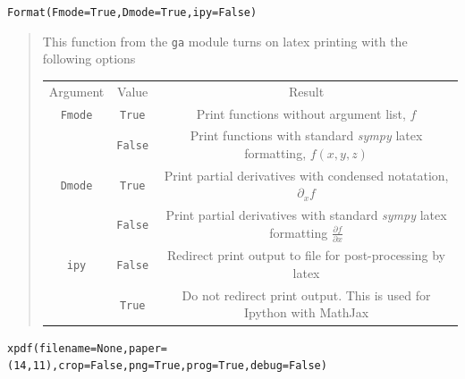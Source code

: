\documentclass[12pt,twoside,openright]{memoir}
\newcommand{\lp}{\left (}
\newcommand{\rp}{\right )}
\newcommand{\f}[2]{{#1}\lp {#2} \rp}
\newcommand{\T}[1]{\texttt{#1}}
\begin{document}
\T{Format(Fmode=True,Dmode=True,ipy=False)}
\begin{quote}
   This function from the \T{ga} module turns on latex printing with the
   following options
\begin{tabular}{ccc}
         Argument &  Value &  Result \\
         \T{Fmode} &  \T{True} &  Print functions without argument list, $f$ \\
               &  \T{False} &  Print functions with standard \emph{sympy} latex formatting, $\f{f}{x,y,z}$ \\
         \T{Dmode} &  \T{True} &  Print partial derivatives with condensed notatation, $\partial_{x}f$ \\
               &  \T{False} &  Print partial derivatives with standard \emph{sympy} latex formatting $\frac{\partial f}{\partial x}$ \\
         \T{ipy}   &  \T{False} &  Redirect print output to file for post-processing by latex \\
               &  \T{True} &  Do not redirect print output.  This is used for Ipython with MathJax
\end{tabular}
\end{quote}
\T{xpdf(filename=None,paper=(14,11),crop=False,png=True,prog=True,debug=False)}
\end{document}
